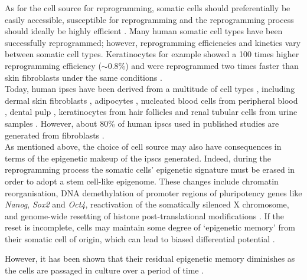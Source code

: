 As for the cell source for reprogramming, somatic cells should preferentially be easily accessible, susceptible for reprogramming and the reprogramming process should ideally be highly efficient \cite{brouwer2016choices}. 
Many human somatic cell types have been successfully reprogrammed; however, reprogramming efficiencies and kinetics vary between somatic cell types. 
Keratinocytes for example showed a 100 times higher reprogramming efficiency ($\sim$0.8\%) and were reprogrammed two times faster than skin fibroblasts under the same conditions \cite{aasen2008efficient}. \\

Today, human \glspl{ipsc} have been derived from a multitude of cell types \cite{doss2019current}, including dermal skin fibroblasts \cite{takahashi2007induction, yu2007induced}, adipocytes \cite{sugii2010human}, nucleated blood cells from peripheral blood \cite{loh2009generation, seki2010generation}, dental pulp \cite{yan2010ips},
keratinocytes from hair follicles \cite{aasen2008efficient} and
renal tubular cells from urine samples \cite{cao2018generation}.
However, about 80\% of human \glspl{ipsc} used in published studies are generated from fibroblasts \cite{takahashi2016decade}. \\

As mentioned above, the choice of cell source may also have consequences in terms of the epigenetic makeup of the \glspl{ipsc} generated.
Indeed, during the reprogramming process the somatic cells' epigenetic signature must be erased in order to adopt a stem cell-like epigenome.
These changes include chromatin reorganisation, DNA demethylation of promoter regions of pluripotency genes like \textit{Nanog}, \textit{Sox2} and \textit{Oct4}, reactivation of the somatically silenced X chromosome, and genome-wide resetting of histone post-translational modifications \cite{takahashi2007induction, maherali2007directly, wernig2007vitro, buganim2013mechanisms}.
If the reset is incomplete, cells may maintain some degree of `epigenetic memory' from their somatic cell of origin, which can lead to biased differential potential \cite{kim2010epigenetic, polo2010cell}.

However, it has been shown that their residual epigenetic memory diminishes as the cells are passaged in culture over a period of time \cite{ghosh2010persistent}.

